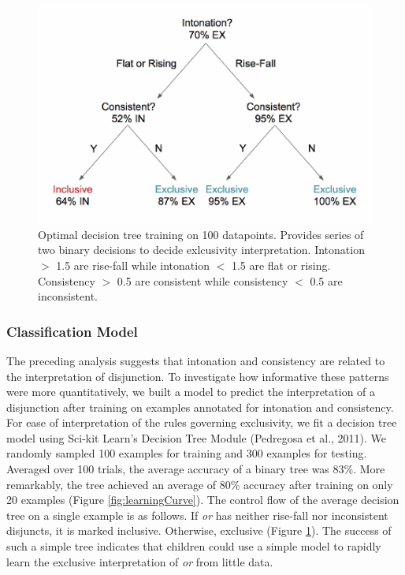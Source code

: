 \documentclass[10pt, letterpaper]{article}
\newenvironment{CodeChunk}{}{}
\begin{document}
\begin{CodeChunk}
\begin{figure}[tb]

{\centering \includegraphics{figs/treeDiagram-1} 

}

\caption[Optimal decision tree training on 100 datapoints]{Optimal decision tree training on 100 datapoints. Provides series of two binary decisions to decide exlcusivity interpretation. Intonation $>$ 1.5 are rise-fall while intonation $<$ 1.5 are flat or rising. Consistency $>$ 0.5 are consistent while consistency $<$ 0.5 are  inconsistent.}\label{fig:treeDiagram}
\end{figure}
\end{CodeChunk}

\subsubsection{Classification Model}\label{classification-model}

The preceding analysis suggests that intonation and consistency are
related to the interpretation of disjunction. To investigate how
informative these patterns were more quantitatively, we built a model to
predict the interpretation of a disjunction after training on examples
annotated for intonation and consistency. For ease of interpretation of
the rules governing exclusivity, we fit a decision tree model using
Sci-kit Learn's Decision Tree Module (Pedregosa et al., 2011). We
randomly sampled 100 examples for training and 300 examples for testing.
Averaged over 100 trials, the average accuracy of a binary tree was
83\%. More remarkably, the tree achieved an average of 80\% accuracy
after training on only 20 examples (Figure \ref{fig:learningCurve}). The
control flow of the average decision tree on a single example is as
follows. If \emph{or} has neither rise-fall nor inconsistent disjuncts,
it is marked inclusive. Otherwise, exclusive (Figure
\ref{fig:treeDiagram}). The success of such a simple tree indicates that
children could use a simple model to rapidly learn the exclusive
interpretation of \emph{or} from little data.
\end{document}
